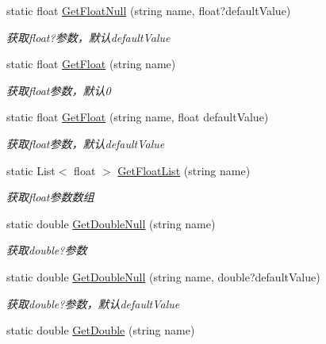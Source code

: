 \begin{DoxyCompactItemize}
static float \hyperlink{class_x_c_l_net_tools_1_1_string_hander_1_1_form_helper_a4647a1a2655436ed24cc07f117109818}{Get\+Float\+Null} (string name, float?default\+Value)
\begin{DoxyCompactList}\small\item\em 获取float?参数，默认default\+Value \end{DoxyCompactList}\item 
static float \hyperlink{class_x_c_l_net_tools_1_1_string_hander_1_1_form_helper_a0807fb3fcdf5a5686fe0d8417013835a}{Get\+Float} (string name)
\begin{DoxyCompactList}\small\item\em 获取float参数，默认0 \end{DoxyCompactList}\item 
static float \hyperlink{class_x_c_l_net_tools_1_1_string_hander_1_1_form_helper_acae860acd22e9f85511ccdc60c071c5c}{Get\+Float} (string name, float default\+Value)
\begin{DoxyCompactList}\small\item\em 获取float参数，默认default\+Value \end{DoxyCompactList}\item 
static List$<$ float $>$ \hyperlink{class_x_c_l_net_tools_1_1_string_hander_1_1_form_helper_ad405fffedfe8e34e61e4118754f99fe4}{Get\+Float\+List} (string name)
\begin{DoxyCompactList}\small\item\em 获取float参数数组 \end{DoxyCompactList}\item 
static double \hyperlink{class_x_c_l_net_tools_1_1_string_hander_1_1_form_helper_ac19469f1fde9f3cbdadb0481dd5bb67d}{Get\+Double\+Null} (string name)
\begin{DoxyCompactList}\small\item\em 获取double?参数 \end{DoxyCompactList}\item 
static double \hyperlink{class_x_c_l_net_tools_1_1_string_hander_1_1_form_helper_a032f11ed043dbf824356f28a2fdcebc7}{Get\+Double\+Null} (string name, double?default\+Value)
\begin{DoxyCompactList}\small\item\em 获取double?参数，默认default\+Value \end{DoxyCompactList}\item 
static double \hyperlink{class_x_c_l_net_tools_1_1_string_hander_1_1_form_helper_a5ce38e7b532cf3daf4a3d564034f78ec}{Get\+Double} (string name)

\end{DoxyCompactItemize}
